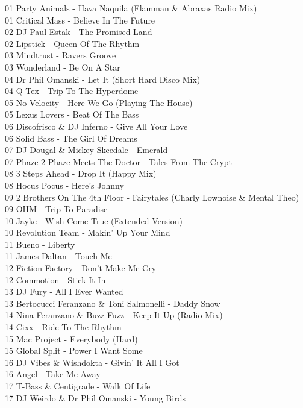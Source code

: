 \begin{multicols}{2}
 01 Party Animals - Hava Naquila (Flamman \& Abraxas Radio Mix)\\ 01 Critical Mass - Believe In The Future\\ 02 DJ Paul Estak - The Promised Land\\ 02 Lipstick - Queen Of The Rhythm\\ 03 Mindtrust - Ravers Groove\\ 03 Wonderland - Be On A Star\\ 04 Dr Phil Omanski - Let It (Short Hard Disco Mix)\\ 04 Q-Tex - Trip To The Hyperdome\\ 05 No Velocity - Here We Go (Playing The House)\\ 05 Lexus Lovers - Beat Of The Bass\\ 06 Discofrisco \& DJ Inferno - Give All Your Love\\ 06 Solid Bass - The Girl Of Dreams\\ 07 DJ Dougal \& Mickey Skeedale - Emerald\\ 07 Phaze 2 Phaze Meets The Doctor - Tales From The Crypt\\ 08 3 Steps Ahead - Drop It (Happy Mix)\\ 08 Hocus Pocus - Here's Johnny\\ 09 2 Brothers On The 4th Floor - Fairytales (Charly Lownoise \& Mental Theo)\\ 09 OHM - Trip To Paradise\\ 10 Jayke - Wish Come True (Extended Version)\\ 10 Revolution Team - Makin' Up Your Mind\\ 11 Bueno - Liberty\\ 11 James Daltan - Touch Me\\ 12 Fiction Factory - Don't Make Me Cry\\ 12 Commotion - Stick It In\\ 13 DJ Fury - All I Ever Wanted\\ 13 Bertocucci Feranzano \& Toni Salmonelli - Daddy Snow\\ 14 Nina Feranzano \& Buzz Fuzz - Keep It Up (Radio Mix)\\ 14 Cixx - Ride To The Rhythm\\ 15 Mac Project - Everybody (Hard)\\ 15 Global Split - Power I Want Some\\ 16 DJ Vibes \& Wishdokta - Givin' It All I Got\\ 16 Angel - Take Me Away\\ 17 T-Bass \& Centigrade - Walk Of Life\\ 17 DJ Weirdo \& Dr Phil Omanski - Young Birds\\

\end{multicols}
